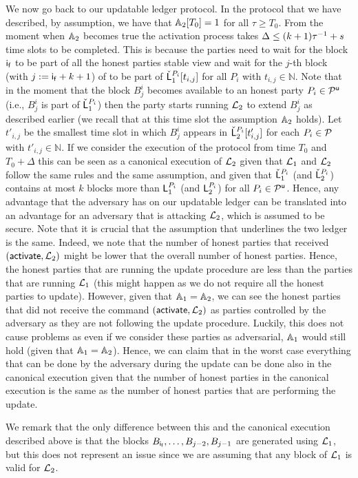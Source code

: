 We now go back to our updatable ledger protocol.
In the protocol that we have described, by assumption, we have that $\mathbb{A}_2[T_0]=1$ for all $\tau \geq T_0$.
From the moment when $\mathbb{A}_2$ becomes true the activation process takes $\Delta\leq (k+1) \tau^{-1} + s$  time slots to be completed.
This is because the parties need to wait for the block $\mathsf{i_f}$ to be part of all the honest parties stable view
and wait for the $j$-th block (with $j:=\mathsf{i_f}+k+1$) of to be part of $\check {\mathsf{L}}_1^{P_i}[t_{i,j}]$  for all $P_i$ with $t_{i,j}\in\mathbb{N}$. 
Note that in the moment that the block $B^i_{j}$ becomes available to an honest party $P_i\in\mathcal{P}^\mathsf{u}$ (i.e., $B^i_{j}$ is part of $\check {\mathsf{L}}_1^{P_i}$) then the party starts running $\mathcal{L}_2$ to extend $B^i_{j}$ as described earlier (we recall that at this time slot the assumption $\mathbb{A}_2$ holds).
Let $t'_{i,j}$ be the smallest time slot in which $B^i_{j}$ appears in $\check {\mathsf{L}}_2^{P_i}[t'_{i,j}]$
 for each $P_i\in\mathcal{P}$ with $t'_{i,j}\in\mathbb{N}$. 
If we consider the execution of the protocol from time $T_0$ and $T_0+\Delta$ this can be seen as a canonical execution of $\mathcal{L}_2$ given that $\mathcal{L}_1$ and $\mathcal{L}_2$ follow the same rules 
and the same assumption, and given that $\check {\mathsf{L}}_1^{P_i}$ (and $\check {\mathsf{L}}_2^{P_i}$) contains at most $k$ blocks 
more than $\mathsf{L}_1^{P_i}$ (and $\mathsf{L}_2^{P_i}$) for all $P_i\in\mathcal{P}^\mathsf{u}$. Hence, any advantage that the adversary has on our updatable ledger can be translated into an advantage for an adversary that is attacking $\mathcal{L}_2$, which is assumed to be secure.
Note that it is crucial that the assumption that underlines the two ledger is the same. Indeed, we note that the
number of honest parties that received $(\mathsf{activate}, \mathcal{L}_2)$ might be lower that the overall number of honest parties. Hence, the honest parties that are running the update procedure are less than the parties that are running $\mathcal{L}_1$ (this might happen as we do not require all the honest parties to update). However, given that 
$\mathbb{A}_1=\mathbb{A}_2$, we can see the honest parties that did not receive the command $(\mathsf{activate},\mathcal{L}_2)$
as parties controlled by the adversary as they are not following the update procedure. Luckily, this does not
cause problems as even if we consider these parties as adversarial, $\mathbb{A}_1$ would still hold  
(given that $\mathbb{A}_1=\mathbb{A}_2$). Hence, we can claim that in the worst case everything that can be done by the adversary during the update can be done also in the canonical execution given that the number of honest parties
in the canonical execution is the same as the number of honest parties that are performing the update.

We remark that the only difference between this and the canonical execution described above is
that the blocks $B_{\mathsf{i_f}},\dots, B_{j-2}, B_{j-1}$  are generated using $\mathcal{L}_1$, but this does not represent an issue since we are assuming that any block of $\mathcal{L}_1$ is valid for $\mathcal{L}_2$.










